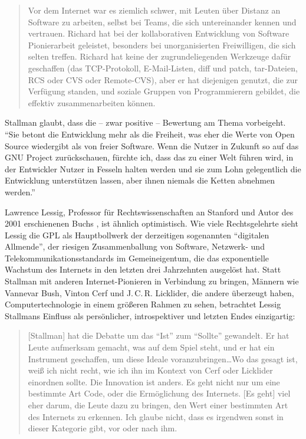 \begin{quote}
Vor dem Internet war es ziemlich schwer, mit Leuten über Distanz an Software zu arbeiten, selbst bei Teams, die sich untereinander kennen und vertrauen. Richard hat bei der kollaborativen Entwicklung von Software Pionierarbeit geleistet, besonders bei unorganisierten Freiwilligen, die sich selten treffen. Richard hat keine der zugrundeliegenden Werkzeuge dafür geschaffen (das TCP-Protokoll, E-Mail-Listen, diff und patch, tar-Dateien, RCS oder CVS oder Remote-CVS), aber er hat diejenigen genutzt, die zur Verfügung standen, und soziale Gruppen von Programmierern gebildet, die effektiv zusammenarbeiten können.
\end{quote}

Stallman glaubt, dass die – zwar positive – Bewertung am Thema vorbeigeht. "`Sie betont die Entwicklung mehr als die Freiheit, was eher die Werte von Open Source wiedergibt als von freier Software. Wenn die Nutzer in Zukunft so auf das GNU Project zurückschauen, fürchte ich, dass das zu einer Welt führen wird, in der Entwickler Nutzer in Fesseln halten werden und sie zum Lohn gelegentlich die Entwicklung unterstützen lassen, aber ihnen niemals die Ketten abnehmen werden."'

Lawrence Lessig, Professor für Rechtswissenschaften an Stanford und Autor des 2001 erschienenen Buchs , ist ähnlich optimistisch. Wie viele Rechtsgelehrte sieht Lessig die GPL als Hauptbollwerk der derzeitigen sogenannten "`digitalen Allmende"', der riesigen Zusammenballung von Software, Netzwerk- und Telekommunikationsstandards im Gemeineigentum, die das exponentielle Wachstum des Internets in den letzten drei Jahrzehnten ausgelöst hat. Statt Stallman mit anderen Internet-Pionieren in Verbindung zu bringen, Männern wie Vannevar Bush, Vinton Cerf und J.\,C.\,R. Licklider, die andere überzeugt haben, Computertechnologie in einem größeren Rahmen zu sehen, betrachtet Lessig Stallmans Einfluss als persönlicher, introspektiver und letzten Endes einzigartig:

\begin{quote}
[Stallman] hat die Debatte um das "`Ist"' zum "`Sollte"' gewandelt. Er hat Leute aufmerksam gemacht, was auf dem Spiel steht, und er hat ein Instrument geschaffen, um diese Ideale voranzubringen\ldots Wo das gesagt ist, weiß ich nicht recht, wie ich ihn im Kontext von Cerf oder Licklider einordnen sollte. Die Innovation ist anders. Es geht nicht nur um eine bestimmte Art Code, oder die Ermöglichung des Internets. [Es geht] viel eher darum, die Leute dazu zu bringen, den Wert einer bestimmten Art des Internets zu erkennen. Ich glaube nicht, dass es irgendwen sonst in dieser Kategorie gibt, vor oder nach ihm.
\end{quote}

